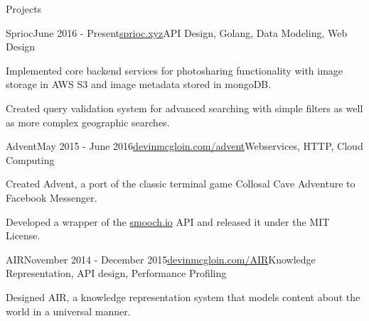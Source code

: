 \documentclass{resume} %
\begin{document}
\begin{rSection}{Projects}


\begin{rSubsection}{Sprioc}{June 2016 - Present}{\href{https://sprioc.xyz}{sprioc.xyz}}{API Design, Golang, Data Modeling, Web Design}
\item Implemented core backend services for photosharing functionality with image storage in AWS S3 and image metadata stored in mongoDB.
\item Created query validation system for advanced searching with simple filters as well as more complex geographic searches.
\end{rSubsection}


\begin{rSubsection}{Advent}{May 2015 - June 2016}{\href{https://devinmcgloin.com/advent}{devinmcgloin.com/advent}}{Webservices, HTTP, Cloud Computing}
\item Created Advent, a port of the classic terminal game Collosal Cave Adventure to Facebook Messenger.
\item Developed a wrapper of the \href{https://smooch.io}{smooch.io} API and released it under the MIT License.
\end{rSubsection}


\begin{rSubsection}{AIR}{November 2014 - December 2015}{\href{https://devinmcgloin.com/AIR}{devinmcgloin.com/AIR}}{Knowledge Representation, API design, Performance Profiling}
\item Designed AIR, a knowledge representation system that models content about the world in a universal manner.
\end{rSubsection}
\end{rSection}
\end{document}
